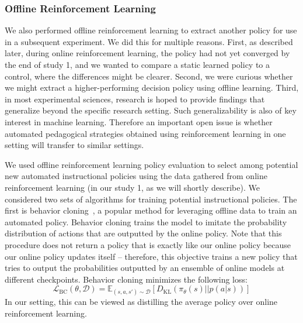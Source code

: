 \documentclass[sn-mathphys,Numbered]{sn-jnl}%
\theoremstyle{thmstyleone}%
\theoremstyle{thmstyletwo}%
\theoremstyle{thmstylethree}%
\begin{document}
\subsubsection*{Offline Reinforcement Learning}
\label{sec:orl}
We also performed offline reinforcement learning to extract another policy for use in a subsequent experiment. We did this for multiple reasons. First, as described later, during online reinforcement learning, the policy had not yet converged by the end of study 1, and we wanted to compare a static learned policy to a control, where the differences might be clearer. Second, we were curious whether we might extract a higher-performing decision policy using offline learning. Third, in most experimental sciences, research is hoped to provide findings that generalize beyond the specific research setting. Such generalizability is also of key interest in machine learning. Therefore an important open issue is whether  automated pedagogical strategies obtained using reinforcement learning in one setting will transfer to similar settings.  

We used offline reinforcement learning policy evaluation to select among potential new automated instructional policies using the data gathered from online reinforcement learning (in our study 1, as we will shortly describe). We considered two sets of algorithms for training potential instructional policies. The first is behavior cloning~\cite{pomerleau1990rapidly,sammut1992learning}, a popular method for leveraging offline data to train an automated policy. Behavior cloning trains the model to imitate the probability distribution of actions that are outputted by the online policy. Note that this procedure does not return a policy that is exactly like our online policy because our online policy updates itself -- therefore, this objective trains a new policy that tries to output the probabilities outputted by an ensemble of online models at different checkpoints. Behavior cloning minimizes the following loss:
\[
\mathcal{L}_{\text{BC}}(\theta, \mathcal{D}) = \mathbb{E}_{(s, a, s') \sim \mathcal{D}}[D_{\text{KL}}(\pi_\theta(s) || p(a|s))]
\]
In our setting, this can be viewed as distilling the average policy over online reinforcement learning.
\end{document}
